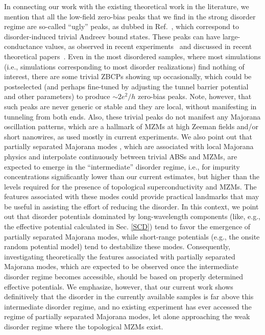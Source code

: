 \documentclass[aps,prmaterials,twocolumn,superscriptaddress,longbibliography]{revtex4-2}
\begin{document}
In connecting our work with the existing theoretical work in the literature, we mention that all the low-field zero-bias peaks that we find in the strong disorder regime are so-called ``ugly'' peaks, as dubbed in Ref.~, which correspond to disorder-induced trivial Andreev bound states.  These peaks can have large-conductance values, as observed in recent experiments~\cite{zhang2021large,nichele2017scaling} and discussed in recent theoretical papers~\cite{dassarma2021disorderinduced,pan2021quantized,woods2021charge}. Even in the most disordered samples, where most simulations (i.e., simulations corresponding to most disorder realizations) find nothing of interest, there are some trivial ZBCPs showing up occasionally, which could be postselected (and perhaps fine-tuned by adjusting the tunnel barrier potential and other parameters) to produce $\sim 2e^2/h$  zero-bias peaks. Note, however, that such peaks are never generic or stable and they are local, without manifesting in tunneling from both ends. Also, these trivial peaks do not manifest any Majorana oscillation patterns, which are a hallmark of MZMs at high Zeeman fields and/or short nanowires, as used mostly in current experiments. 
We also point out that partially separated Majorana modes \cite{stanescu2019robust,zeng2021partiallyseparated}, which are associated with local Majorana physics and interpolate continuously between trivial ABSs and MZMs, are expected to emerge in the ``intermediate'' disorder regime, i.e., for impurity concentrations significantly lower than our current estimates, but higher than the levels required for the presence of topological superconductivity and MZMs. The features associated with these modes \cite{zeng2021partiallyseparated} could provide practical landmarks that may be useful in assisting the effort of reducing the disorder. In this context, we point out that disorder potentials dominated by long-wavelength components (like, e.g., the effective potential calculated in Sec. \ref{SCD}) tend to favor the emergence of partially separated Majorana modes, while short-range potentials (e.g., the onsite random potential model) tend to destabilize these modes. Consequently, investigating theoretically the features associated with partially separated Majorana modes, which are expected to be observed once the intermediate disorder regime becomes accessible, should be based on properly determined effective potentials. We emphasize, however, that our current work shows definitively that the disorder in the currently available samples is far above this intermediate disorder regime, and no existing experiment has ever accessed the regime of partially separated Majorana modes, let alone approaching the weak disorder regime where the topological MZMs exist.
\end{document}
